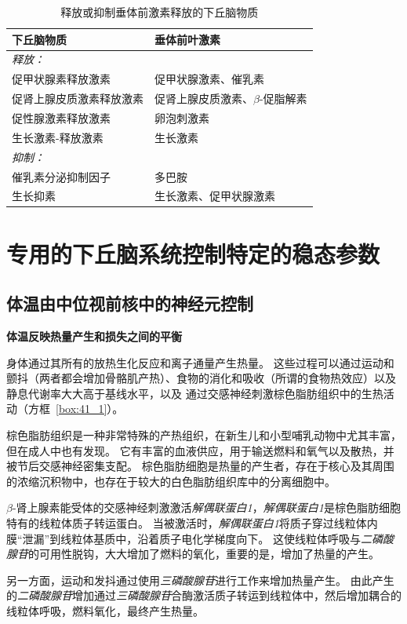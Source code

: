 \begin{table}[htbp]
	\caption{释放或抑制垂体前激素释放的下丘脑物质} \label{tab:41_3} \centering
	\begin{tabular}{ll}
		\toprule
		下丘脑物质 & 垂体前叶激素 \\
		\midrule
		\textit{释放：} &  \\
		促甲状腺素释放激素 & 促甲状腺激素、催乳素  \\
		促肾上腺皮质激素释放激素 & 促肾上腺皮质激素、$\beta$-促脂解素  \\
		促性腺激素释放激素 & 卵泡刺激素  \\
		生长激素-释放激素 & 生长激素  \\
		\textit{抑制：} &  \\
		催乳素分泌抑制因子 & 多巴胺  \\
		生长抑素 & 生长激素、促甲状腺激素  \\
		\bottomrule
	\end{tabular}
\end{table}



\section{专用的下丘脑系统控制特定的稳态参数}

\subsection{体温由中位视前核中的神经元控制}

\textbf{体温反映热量产生和损失之间的平衡}

身体通过其所有的放热生化反应和离子通量产生热量。
这些过程可以通过运动和颤抖（两者都会增加骨骼肌产热）、食物的消化和吸收（所谓的食物热效应）以及静息代谢率大大高于基线水平，以及 通过交感神经刺激棕色脂肪组织中的生热活动（方框~\ref{box:41_1}）。


\begin{proposition} \label{box:41_1}
	
	\quad \quad 棕色脂肪组织是一种非常特殊的产热组织，在新生儿和小型哺乳动物中尤其丰富，但在成人中也有发现。
	它有丰富的血液供应，用于输送燃料和氧气以及散热，并被节后交感神经密集支配。
	棕色脂肪细胞是热量的产生者，存在于核心及其周围的浓缩沉积物中，也存在于较大的白色脂肪组织库中的分离细胞中。
	
	\quad \quad $\beta$-肾上腺素能受体的交感神经刺激激活\textit{解偶联蛋白1}，\textit{解偶联蛋白1}是棕色脂肪细胞特有的线粒体质子转运蛋白。
	当被激活时，\textit{解偶联蛋白1}将质子穿过线粒体内膜“泄漏”到线粒体基质中，沿着质子电化学梯度向下。
	这使线粒体呼吸与\textit{二磷酸腺苷}的可用性脱钩，大大增加了燃料的氧化，重要的是，增加了热量的产生。
	
	\quad \quad 另一方面，运动和发抖通过使用\textit{三磷酸腺苷}进行工作来增加热量产生。
	由此产生的\textit{二磷酸腺苷}增加通过\textit{三磷酸腺苷}合酶激活质子转运到线粒体中，然后增加耦合的线粒体呼吸，燃料氧化，最终产生热量。
	
\end{proposition}


